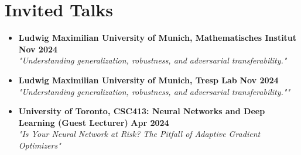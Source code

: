 \section*{Invited Talks}
\vspace{\postsubhead}
\begin{adjustwidth}{\indentleft}{\indentright}
  \begin{itemize}

    \item \textbf{Ludwig Maximilian University of Munich, Mathematisches Institut}
    \hfill
    \textbf{Nov 2024}\\
    \textit{"Understanding generalization, robustness, and adversarial transferability."}
    \vspace{\interlist}

    \item \textbf{Ludwig Maximilian University of Munich, Tresp Lab}
    \hfill
    \textbf{Nov 2024}\\
    \textit{"Understanding generalization, robustness, and adversarial transferability.""}
    \vspace{\interlist}

    \item \textbf{University of Toronto, CSC413: Neural Networks and Deep Learning (Guest Lecturer)}
    \hfill
    \textbf{Apr 2024}\\
    \textit{"Is Your Neural Network at Risk? The Pitfall of Adaptive Gradient Optimizers"}
    \vspace{\interlist}
    
    
    
    
  \end{itemize}
\end{adjustwidth}
